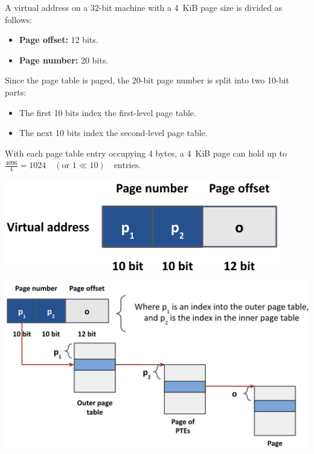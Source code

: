 \documentclass[../../compsys.tex]{subfiles}
\begin{document}
\begin{example}
A virtual address on a 32-bit machine with a 4~KiB page size is divided as follows:
\begin{itemize}
  \item \textbf{Page offset:} 12 bits.
  \item \textbf{Page number:} 20 bits.
\end{itemize}
Since the page table is paged, the 20-bit page number is split into two 10-bit parts:
\begin{itemize}
  \item The first 10 bits index the first-level page table.
  \item The next 10 bits index the second-level page table.
\end{itemize}
With each page table entry occupying 4 bytes, a 4~KiB page can hold up to $\frac{4096}{4} = 1024 \quad (\text{or } 1 \ll 10) \quad \text{entries}$. \\
\noindent
\begin{minipage}{0.40\textwidth}
\begin{center}
  \includegraphics[width=0.9\textwidth]{chapters/L5/images/two-level-address.png}
\end{center}
\end{minipage}%
\hfill
\vline
\hfill
\begin{minipage}{0.50\textwidth}
\begin{center}
  \includegraphics[width=1.1\textwidth]{chapters/L5/images/two-level-diagram.png}
\end{center}
\end{minipage}
\end{example}
\normalsize
\end{document}
